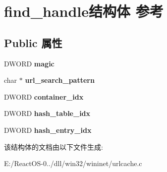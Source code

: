 \hypertarget{structfind__handle}{}\section{find\+\_\+handle结构体 参考}
\label{structfind__handle}
\subsection*{Public 属性}
\begin{DoxyCompactItemize}
\item 
\mbox{\label{structfind__handle_a2c9481ebd9d36e0c3b1f909f2b1975c8}} 
D\+W\+O\+RD {\bfseries magic}
\item 
\mbox{\label{structfind__handle_a7b4dcf139ed9374499e4fb0eec1ab7b3}} 
char $\ast$ {\bfseries url\+\_\+search\+\_\+pattern}
\item 
\mbox{\label{structfind__handle_ae5936da05a60635dd1f6875c79c3a275}} 
D\+W\+O\+RD {\bfseries container\+\_\+idx}
\item 
\mbox{\label{structfind__handle_a9788cf134d30d5b5275e4d89e9883d17}} 
D\+W\+O\+RD {\bfseries hash\+\_\+table\+\_\+idx}
\item 
\mbox{\label{structfind__handle_aac287b3c03828482b59c019f95ce22d7}} 
D\+W\+O\+RD {\bfseries hash\+\_\+entry\+\_\+idx}
\end{DoxyCompactItemize}


该结构体的文档由以下文件生成\+:\begin{DoxyCompactItemize}
\item 
E\+:/\+React\+O\+S-\/0../dll/win32/wininet/urlcache.\+c\end{DoxyCompactItemize}

